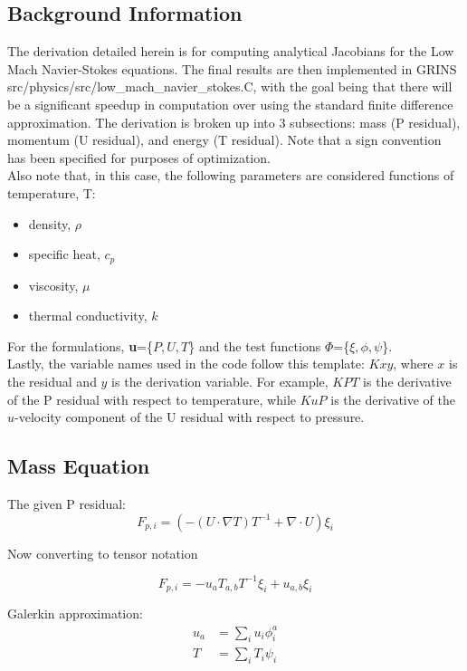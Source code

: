 \subsection{Background Information}
The derivation detailed herein is for computing analytical Jacobians for the Low Mach Navier-Stokes equations. The final results are then implemented in GRINS src/physics/src/low\_mach\_navier\_stokes.C, with the goal being that there
will be a significant speedup in computation over using the standard finite difference approximation. The derivation is broken up into 3 subsections: mass (P residual), momentum (U residual), and energy (T residual).
Note that a sign convention has been specified for purposes of optimization.\\
Also note that, in this case, the following parameters are considered functions of temperature, T:
\begin{itemize}
    \item density, $\rho$
    \item specific heat, $c_p$
    \item viscosity, $\mu$
    \item thermal conductivity, $k$
\end{itemize}
For the formulations, \textbf{u}=\{$P,U,T$\} and the test functions \textbf{$\Phi$}=\{$\xi,\phi,\psi$\}.\\
Lastly, the variable names used in the code follow this template: $Kxy$, where $x$ is the residual and $y$ is the derivation variable.  For example, $KPT$ is the derivative of the P residual with respect to temperature,
while $KuP$ is the derivative of the $u$-velocity component of the U residual with respect to pressure. 

\newpage
\subsection{Mass Equation}
The given P residual:
\begin{equation}
    F_{p,i} = (-(U \cdot \nabla T) T^{-1} + \nabla \cdot U)\xi_i
\end{equation}

Now converting to tensor notation

\begin{equation}
    F_{p,i} = -u_a T_{a,b} T^{-1} \xi_i + u_{a,b}\xi_i
\end{equation}

Galerkin approximation:
\begin{align*}
    u_a &= \sum_i u_i \phi_i^a\\
    T &= \sum_i T_i \psi_i
\end{align*}

